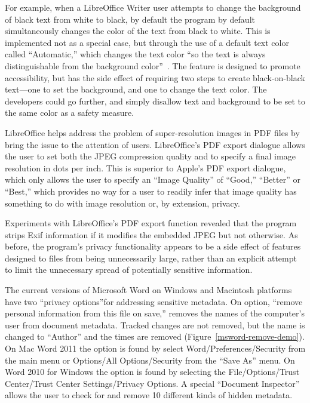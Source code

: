 For example, when a LibreOffice Writer user attempts to change the
background of black text from white to black,  by default the program by default
simultaneously changes the color of the text from black to white. This is implemented not as a special case, but
through the use of a  default text color called ``Automatic,'' which
changes the text color ``so the text is always distinguishable from the background
color''~\cite{libreoffice-accessibility}. The feature is designed to
promote accessibility, but has the side effect of requiring two steps
to create black-on-black text---one  to set the background, and
one  to change the text color. The developers could go 
further, and simply disallow text and background to be set to the same
color as a safety measure.

LibreOffice helps address the problem of super-resolution images in
PDF files by bring the issue to the attention of users. 
LibreOffice's PDF export dialogue allows the user to set both the JPEG
compression quality and to specify a final image resolution in dots
per inch. This is superior to
Apple's PDF export dialogue, which only allows the user to specify
an ``Image Quality'' of ``Good,'' ``Better'' or ``Best,'' which provides no way for a user to readily
infer that image quality has something to do with image resolution or,
by extension, privacy.

Experiments with LibreOffice's PDF export function revealed that the
program strips Exif information if it modifies the embedded JPEG but
not otherwise. As before, the program's privacy functionality appears to
be a side effect of features designed to files from being
unnecessarily large, rather than an explicit attempt to limit the
unnecessary spread of potentially sensitive information. 

The current versions of Microsoft Word on Windows and Macintosh
platforms have two ``privacy options''for addressing sensitive metadata. On
option, ``remove personal information from this file on save,''
removes the names of the computer's user from document
metadata. Tracked changes are not removed, but the name is changed
to ``Author'' and the times are removed
(Figure~\ref{msword-remove-demo}). On Mac Word 2011 the option is found by
select Word/Preferences/Security from the main menu or Options/All
Options/Security from the ``Save As'' menu. On Word 2010 for Windows
the option is found by selecting the File/Options/Trust Center/Trust
Center Settings/Privacy Options. A special ``Document Inspector''
allows the user to check for and remove 10 different kinds of hidden
metadata. 

